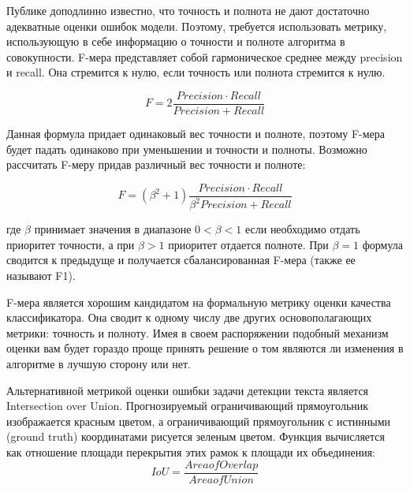 \documentclass[12pt,twoside]{article}
\begin{document}
Публике доподлинно известно, что точность и полнота не дают достаточно адекватные оценки ошибок модели. Поэтому, требуется использовать метрику, использующую в себе информацию о точности и полноте алгоритма в совокупности. F-мера представляет собой гармоническое среднее между precision и recall. Она стремится к нулю, если точность или полнота стремится к нулю.

$$ F=2\frac{Precision \cdot Recall}{Precision + Recall} $$

Данная формула придает одинаковый вес точности и полноте, поэтому F-мера будет падать одинаково при уменьшении и точности и полноты. Возможно рассчитать F-меру придав различный вес точности и полноте:

$$ F=(\beta^2+1)\frac{Precision \cdot Recall}{\beta^2 Precision + Recall} $$

где $\beta$ принимает значения в диапазоне $0<\beta<1$ если необходимо отдать приоритет точности, а при $\beta>1$ приоритет отдается полноте. При $\beta=1$ формула сводится к предыдуще и получается сбалансированная F-мера (также ее называют F1).

F-мера является хорошим кандидатом на формальную метрику оценки качества классификатора. Она сводит к одному числу две других основополагающих метрики: точность и полноту. Имея в своем распоряжении подобный механизм оценки вам будет гораздо проще принять решение о том являются ли изменения в алгоритме в лучшую сторону или нет.

Альтернативной метрикой оценки ошибки задачи детекции текста является Intersection over Union. Прогнозируемый ограничивающий прямоугольник изображается красным цветом, а ограничивающий прямоугольник с истинными (ground truth) координатами рисуется зеленым цветом. Функция вычисляется как отношение площади перекрытия этих рамок к площади их объединения:
$$ IoU = \frac{Area of Overlap}{ Area of Union} $$

 
 
\end{document}
